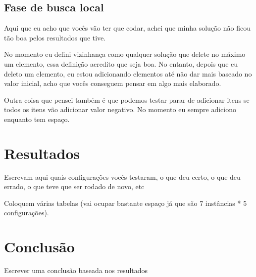 \documentclass{article}
\begin{document}
\subsection{Fase de busca local}

Aqui que eu acho que vocês vão ter que codar, achei que minha solução não ficou tão boa pelos resultados que tive.

No momento eu defini vizinhança como qualquer solução que delete no máximo um elemento, essa definição acredito que seja boa. No entanto, depois que eu deleto um elemento, eu estou adicionando elementos até não dar mais baseado no valor inicial, acho que vocês conseguem pensar em algo mais elaborado.

Outra coisa que pensei também é que podemos testar parar de adicionar itens se todos os itens vão adicionar valor negativo. No momento eu sempre adiciono enquanto tem espaço.

\section{Resultados}

Escrevam aqui quais configurações vocês testaram, o que deu certo, o que deu errado, o que teve que ser rodado de novo, etc

Coloquem várias tabelas (vai ocupar bastante espaço já que são 7 instâncias * 5 configurações).


\section{Conclusão}

Escrever uma conclusão baseada nos resultados
\end{document}
